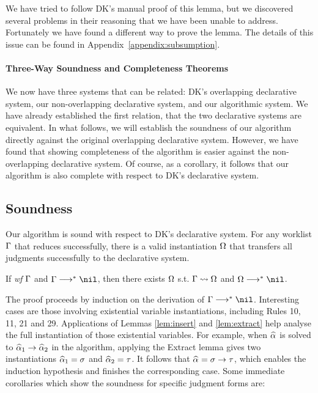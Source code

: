 We have tried to follow DK's manual proof of this lemma,
but we discovered several problems in their reasoning that we have been unable to address.
Fortunately we have found a different way to prove the lemma.
The details of this issue can be found in Appendix~\ref{appendix:subsumption}.

\paragraph{Three-Way Soundness and Completeness Theorems}
We now have three systems that can be related: DK's overlapping declarative system,
our non-overlapping declarative system, and our algorithmic system.
We have already established the first relation, that the two declarative
systems are equivalent.
In what follows, we will establish the soundness of our algorithm directly
against the original overlapping declarative system. However, we have found
that showing completeness of the algorithm is easier against the
non-overlapping declarative system. Of course, as a corollary, it follows that
our algorithm is also complete with respect to DK's declarative system.

\subsection{Soundness}

Our algorithm is sound with respect to DK's declarative system.
For any worklist $\Gamma$ that reduces successfully,
there is a valid instantiation $\Omega$ that transfers all judgments successfully to the declarative system.
\begin{theorem}[Soundness]
If \emph{wf }$\Gamma$ and $\Gm \redto \nil$,
then there exists $\Omega$ s.t. $\Gamma\rightsquigarrow\Omega$ and $\Om\redto\nil$.
\end{theorem}

The proof proceeds by induction on the derivation of $\Gm\redto\nil$.
Interesting cases are those involving existential variable instantiations,
including Rules 10, 11, 21 and 29.
Applications of Lemmas \ref{lem:insert} and \ref{lem:extract}
help analyse the full instantiation of those existential variables.
For example, when $\al$ is solved to $\al[1] \to \al[2]$ in the algorithm,
applying the Extract lemma gives two instantiations $\al[1] = \sigma$ and $\al[2] = \tau$.
It follows that $\al = \sigma \to \tau$, which enables the induction hypothesis
and finishes the corresponding case. Some immediate corollaries which
show the soundness for specific judgment forms are: 


